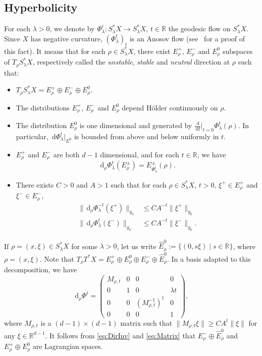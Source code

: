 \documentclass[10pt]{amsart}
\let\sep\mid
\newcommand{\rd}{\,\mathrm{d}}
\theoremstyle{plain}
\theoremstyle{definition}
\newcommand{\R}{\mathbb{R}}
\begin{document}
\subsection{Hyperbolicity}\label{ss:back_to_hyperbolicity}

For each $\lambda > 0$, we denote by $\Phi_\lambda^t:S_\lambda^*X\to S_\lambda^*X$, $t\in\R$ the geodesic flow on $S_\lambda^*X$.
Since $X$ has negative curvature, $(\Phi_\lambda^t)_t$ is an Anosov flow (see~\cite{Ebe} for a proof of this fact). It means that for each $\rho\in S_\lambda^*X$, there exist $E_\rho^+$, $E_\rho^-$ and $E_\rho^0$ subspaces of $T_\rho S_\lambda^*X$, respectively called the \emph{unstable}, \emph{stable} and \emph{neutral} direction at $\rho$ such that:
\begin{itemize}
\item $T_\rho S_\lambda^*X=E_\rho^+\oplus E_\rho^-\oplus E_\rho^0$.
\item The distributions $E_\rho^+$, $E_\rho^-$ and $E_\rho^0$ depend Hölder continuously on $\rho$.
\item The distribution $E_\rho^0$ is one dimensional and generated by $\frac{\rd}{\rd t}|_{t=0}\Phi^t_\lambda(\rho)$. In particular, $\rd \Phi^t_\lambda|_{E^0}$ is bounded from above and below uniformly in $t$.
\item $E_\rho^+$ and $E_\rho^-$ are both $d-1$ dimensional, and for each $t\in\R$, we have \begin{equation}\label{eq:DirInv}
\rd _\rho\Phi^t_\lambda(E^\pm_\rho)=E^\pm_{\Phi^t_\lambda}(\rho).
\end{equation}
\item There exists $C>0$ and $A>1$ such that for each $\rho\in S_\lambda^*X$, $t>0$, $\xi^+\in E^+_\rho$ and $\xi^-\in E^-_\rho$,
\begin{equation}\label{eq:DefHyp}
\begin{aligned}
\|\rd _\rho\Phi^{-t}_\lambda(\xi^+)\|_{g_0}&\leq C A^{-t} \|\xi^+\|_{g_0}\\
\|\rd _\rho\Phi^t_\lambda(\xi^-)\|_{g_0}&\leq C A^{-t}\|\xi^-\|_{g_0}.
\end{aligned}
\end{equation}
\end{itemize}

If $\rho = (x,\xi) \in S_\lambda^*X$ for some $\lambda>0$, let us write $\hat{E}^0_\rho :=\{(0,s\xi)\sep s\in\R\}$, where $\rho=(x,\xi)$. Note that $T_\rho T^*X = E_\rho^+\oplus E_\rho^0\oplus E_\rho^- \oplus \hat{E}_\rho^0$.
In a basis adapted to this decomposition, we have
\begin{equation}\label{eq:Matrix}
\rd _\rho \Phi^t = \begin{pmatrix}
M_{\rho,t} & 0 & 0 & 0\\
0 & 1 & 0 & \lambda t\\
0 & 0 & (M_{\rho,t}^{-1})^\dagger & 0\\
0 & 0 & 0 & 1
\end{pmatrix},
\end{equation}
where $M_{\rho,t}$ is a $(d-1) \times (d-1)$ matrix such that $\|M_{\rho,t} \xi\| \geq C A^t \|\xi\|$ for any $\xi \in \R^{d-1}$. It follows from \eqref{eq:DirInv} and \eqref{eq:Matrix} that $E_\rho^-\oplus \hat{E}^0_\rho$ and $E_\rho^+\oplus E_\rho^0$ are Lagrangian spaces.
\end{document}
